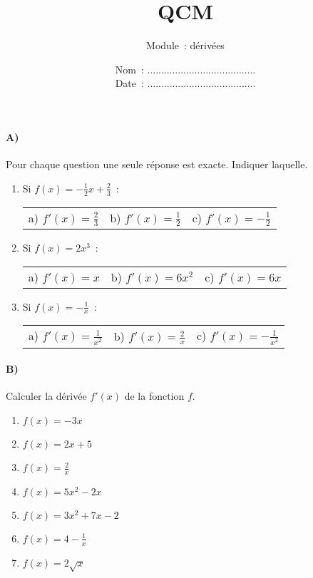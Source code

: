 \documentclass[a4paper]{article}
\begin{document}
  \title{QCM}
  \author{Module~: dérivées}
  \date{
    Nom~: .......................................\\
    \vspace{0.2cm}
    Date~: .......................................}
  \maketitle
  
  \paragraph{A)}
  Pour chaque question une seule réponse est exacte. Indiquer laquelle.
  \begin{enumerate}
    \item
      Si $\displaystyle f(x) = - \frac{1}{2} x + \frac{2}{3}$~:
      \begin{center}
        \begin{tabular}{p{3cm}p{3cm}p{3cm}}
          a) $\displaystyle f'(x) = \frac{2}{3}$ & b) $\displaystyle f'(x) = \frac{1}{2}$ & c) $\displaystyle f'(x) = - \frac{1}{2}$
        \end{tabular}
      \end{center}

    \item
      Si $f(x) = 2 x^3$~:
      \begin{center}
        \begin{tabular}{p{3cm}p{3cm}p{3cm}}
          a) $f'(x) = x$ & b) $f'(x) = 6 x^2$ & c) $f'(x) = 6x$
        \end{tabular}
      \end{center}

    \item
      Si $\displaystyle f(x) = - \frac{1}{x}$~:
      \begin{center}
        \begin{tabular}{p{3cm}p{3cm}p{3cm}}
          a) $\displaystyle f'(x) = \frac{1}{x^2}$ & b) $\displaystyle f'(x) = \frac{2}{x}$ & c) $\displaystyle f'(x) = - \frac{1}{x^2}$
        \end{tabular}
      \end{center}
  \end{enumerate}

  \paragraph{B)}
  Calculer la dérivée $f'(x)$ de la fonction $f$.
  \begin{enumerate}
    \itemsep 0.7cm
    \item $f(x) = - 3 x$
    \item $f(x) = 2x + 5$
    \item $\displaystyle f(x) = \frac{2}{x}$
    \item $f(x) = 5 x^2 - 2x$
    \item $f(x) = 3 x^2 + 7x - 2$
    \item $\displaystyle f(x) = 4 - \frac{1}{x}$
    \item $f(x) = 2 \sqrt{x}$
  \end{enumerate}
\end{document}
